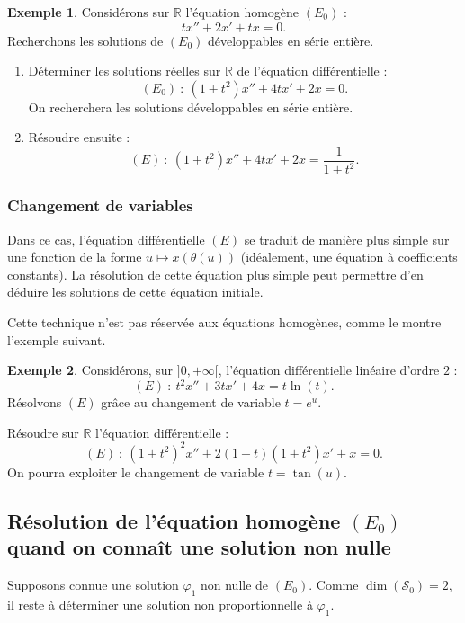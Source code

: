 \documentclass[french]{article}
\newcommand{\R}{\mathbb{R}}
\theoremstyle{plain}
\theoremstyle{definition}
\newtheorem*{ex}{Exemple}
\theoremstyle{remark}
\begin{document}
\begin{ex}
	Considérons sur $\R$ l'équation homogène $(E_0)$ :
	$$tx''+2x'+tx=0.$$
	Recherchons les solutions de $(E_0)$ développables en série entière.
\end{ex}

\begin{exo}
	\begin{enumerate}
		\item Déterminer les solutions réelles sur $\R$ de l'équation différentielle :
		$$(E_0)\ :\ (1+t^2)x''+4tx'+2x=0.$$
		On recherchera les solutions développables en série entière.
		\item Résoudre ensuite :
		$$(E)\ :\ (1+t^2)x''+4tx'+2x=\frac{1}{1+t^2}.$$
	\end{enumerate}
\end{exo}

\subsubsection*{Changement de variables}

Dans ce cas, l'équation différentielle $(E)$ se traduit de manière plus simple sur une fonction de la forme $u\mapsto x(\theta(u))$ (idéalement, une équation à coefficients constants). La résolution de cette équation plus simple peut permettre d'en déduire les solutions de cette équation initiale.

Cette technique n'est pas réservée aux équations homogènes, comme le montre l'exemple suivant.

\begin{ex}
	Considérons, sur $]0,+\infty[$, l'équation différentielle linéaire d'ordre $2$ :
	$$(E)\ :\ t^2x''+3tx'+4x=t\ln(t).$$
	Résolvons $(E)$ grâce au changement de variable $t=e^u$.
\end{ex}

\begin{exo}
	Résoudre sur $\R$ l'équation différentielle :
	$$(E)\ :\ (1+t^2)^2x''+2(1+t)(1+t^2)x'+x=0.$$
	On pourra exploiter le changement de variable $t=\tan(u)$.
\end{exo}

\subsection{Résolution de l'équation homogène $(E_0)$ quand on connaît une solution non nulle}

Supposons connue une solution $\varphi_1$ non nulle de $(E_0)$. Comme $\dim(\mathcal{S}_0)=2$, il reste à déterminer une solution non proportionnelle à $\varphi_1$.
\end{document}

